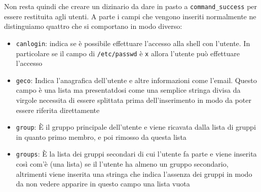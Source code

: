 \documentclass[11pt]{article}
\begin{document}
Non resta quindi che creare un dizinario da dare in pasto a \texttt{command\_success} per essere restituita agli utenti.
A parte i campi che vengono inseriti normalmente ne distinguiamo quattro che si comportano in modo diverso:
\begin{itemize}
	\item{\texttt{canlogin}: indica se è possibile effettuare l'accesso alla shell con l'utente.
		In particolare se il campo di \texttt{/etc/passwd} è \texttt{x} allora l'utente può effettuare l'accesso}
	\item{\texttt{geco}: Indica l'anagrafica dell'utente e altre informazioni come l'email. Questo campo è una lista
		ma presentatdosi come una semplice stringa divisa da virgole necessita di essere splittata prima dell'inserimento
		in modo da poter essere riferita direttamente}
	\item{\texttt{group}: È il gruppo principale dell'utente e viene ricavata dalla lista di gruppi in quanto primo membro,
		e poi rimosso da questa lista}
	\item{\texttt{groups}: È la lista dei gruppi secondari di cui l'utente fa parte e viene inserita così com'è (una lista)
		se il l'utente ha almeno un gruppo secondario, altrimenti viene inserita una stringa che indica l'assenza dei gruppi
		in modo da non vedere apparire in questo campo una lista vuota}
\end{itemize}
\end{document}
